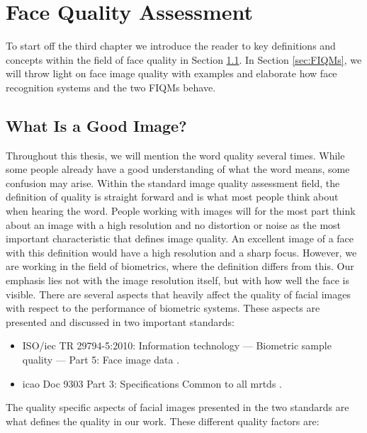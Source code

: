 \chapter{Face Quality Assessment}
\label{chap:FQA}
To start off the third chapter we introduce the reader to key definitions and concepts within the field of face quality in Section \ref{sec:setup}. In Section \ref{sec:FIQMs}, we will throw light on face image quality with examples and elaborate how face recognition systems and the two FIQMs behave.  

\section{What Is a Good Image?}
\label{sec:setup}
Throughout this thesis, we will mention the word quality several times. While some people already have a good understanding of what the word means, some confusion may arise. Within the standard image quality assessment field, the definition of quality is straight forward and is what most people think about when hearing the word. People working with images will for the most part think about an image with a high resolution and no distortion or noise as the most important characteristic that defines image quality. An excellent image of a face with this definition would have a high resolution and a sharp focus. However, we are working in the field of biometrics, where the definition differs from this. Our emphasis lies not with the image resolution itself, but with how well the face is visible. There are several aspects that heavily affect the quality of facial images with respect to the performance of biometric systems. These aspects are presented and discussed in two important standards: 
%
\begin{itemize}
    \item ISO/\acrshort{iec} TR 29794-5:2010: Information technology — Biometric sample quality — Part 5: Face image data \cite{ISO50912}.
    \item \acrshort{icao} Doc 9303 Part 3: Specifications Common to all \acrshort{mrtd}s \cite{ICAO1}. 
\end{itemize}
%
The quality specific aspects of facial images presented in the two standards are what defines the quality in our work. These different quality factors are:  

